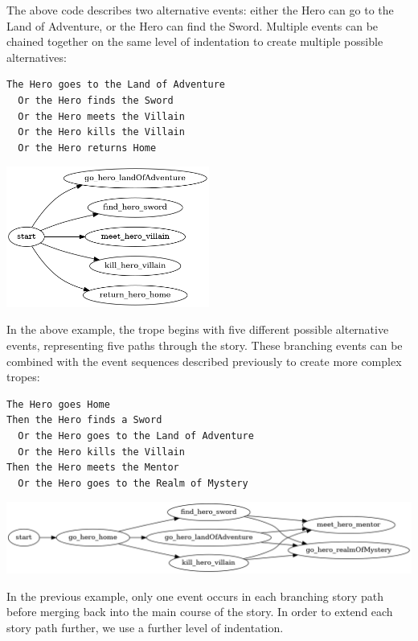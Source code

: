 \documentclass[11pt]{report}
\begin{document}
The above code describes two alternative events: either the Hero can go to the
Land of Adventure, or the Hero can find the Sword.
Multiple events can be chained together on the same level of indentation to create
multiple possible alternatives:

\begin{lstlisting}[label={lst:branch2}, caption={Five branches}]
The Hero goes to the Land of Adventure
  Or the Hero finds the Sword
  Or the Hero meets the Villain
  Or the Hero kills the Villain
  Or the Hero returns Home
\end{lstlisting}

\vspace{7mm}
\centerline{\includegraphics[width=0.5\textwidth]{branch2.png}}
\vspace{7mm}

In the above example, the trope begins with five different possible alternative
events, representing five paths through the story.
These branching events can be combined with the event sequences described
previously to create more complex tropes:

\begin{lstlisting}[label={lst:branch3}, caption={A combination of branches and sequences}]
The Hero goes Home
Then the Hero finds a Sword
  Or the Hero goes to the Land of Adventure
  Or the Hero kills the Villain
Then the Hero meets the Mentor
  Or the Hero goes to the Realm of Mystery
\end{lstlisting}

\vspace{7mm}
\centerline{\includegraphics[width=\textwidth]{branch3.png}}
\vspace{7mm}

In the previous example, only one event occurs in each branching story path
before merging back into the main course of the story. In order to extend each
story path further, we use a further level of indentation.
\end{document}
